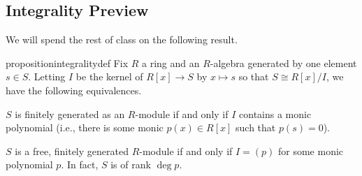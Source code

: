 \subsection{Integrality Preview}
We will spend the rest of class on the following result.
\begin{restatable}{proposition}{integralitydef} \label{prop:integralitydef}
	Fix $R$ a ring and an $R$-algebra generated by one element $s\in S$. Letting $I$ be the kernel of $R[x]\to S$ by $x\mapsto s$ so that $S\cong R[x]/I$, we have the following equivalences.
	\begin{listalph}
		\item $S$ is finitely generated as an $R$-module if and only if $I$ contains a monic polynomial (i.e., there is some monic $p(x)\in R[x]$ such that $p(s)=0$).
		\item $S$ is a free, finitely generated $R$-module if and only if $I=(p)$ for some monic polynomial $p$. In fact, $S$ is of rank $\deg p$.
	\end{listalph}
\end{restatable}
